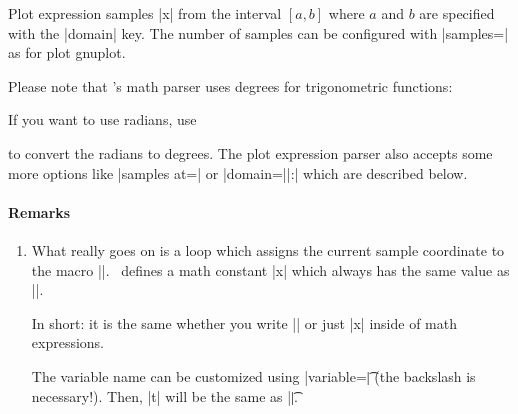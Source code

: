 {\begin{addplotoperation}[]{}{}
	Plot expression samples |x| from the interval $[a,b]$ where $a$ and $b$ are specified with the |domain| key. The number of samples can be configured with |samples=| as for plot gnuplot.

\begin{codeexample}[]
\end{codeexample}

Please note that \PGF's math parser uses degrees for trigonometric functions:
\begin{codeexample}[]
\end{codeexample}
\noindent If you want to use radians, use 
\begin{codeexample}[]
\end{codeexample}
\noindent to convert the radians to degrees. The plot expression parser also accepts some more options like |samples at=| or |domain=||:| which are described below.

\paragraph{Remarks}
\begin{enumerate} 
	\item What really goes on is a loop which assigns the current sample coordinate to the macro |\x|. \PGFPlots\ defines a math constant |x| which always has the same value as |\x|.

	In short: it is the same whether you write |\x| or just |x| inside of math expressions.

	The variable name can be customized using |variable=\t| (the backslash is necessary!). Then, |t| will be the same as |\t|.
%


\end{enumerate}
\end{addplotoperation}}
